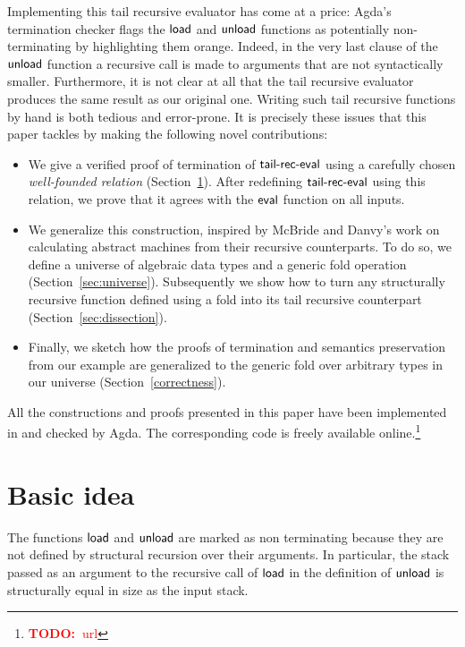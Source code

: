 \documentclass[sigplan,10pt,review]{acmart}
\newcommand\todo[1]{\textcolor{red}{\textbf{TODO:~}#1}}
\newcommand{\AF}{\AgdaFunction}
\newcommand{\nonterm}[1]{\hspace*{-0.1cm}\colorbox{orange!25}{#1}}
\begin{document}
Implementing this tail recursive evaluator has come at a price: Agda's
termination checker flags the \ensuremath{\AF{load}} and \ensuremath{\AF{unload}} functions as
potentially non-terminating by highlighting them
\nonterm{orange}. Indeed, in the very last clause of the \ensuremath{\AF{unload}}
function a recursive call is made to arguments that are not
syntactically smaller. Furthermore, it is not clear at all that the
tail recursive evaluator produces the same result as our original
one. Writing such tail recursive functions by hand is both tedious and
error-prone. It is precisely these issues that this paper tackles
by making the following novel contributions:

\begin{itemize}
\item We give a verified proof of termination of \ensuremath{\AF{tail\text{-}rec\text{-}eval}} using
  a carefully chosen \emph{well-founded relation}
  (Section~\ref{sec:basics}). After redefining \ensuremath{\AF{tail\text{-}rec\text{-}eval}} using
  this relation, we prove that it agrees with the \ensuremath{\AF{eval}} function on
  all inputs.
\item We generalize this construction, inspired by McBride and Danvy's
  work on calculating abstract machines from their recursive
  counterparts. To do so, we define a universe of algebraic data types
  and a generic fold operation
  (Section~\ref{sec:universe}). Subsequently we show how to turn any
  structurally recursive function defined using a fold into its tail
  recursive counterpart (Section~\ref{sec:dissection}).
\item Finally, we sketch how the proofs of termination and semantics
  preservation from our example are generalized to the generic fold
  over arbitrary types in our universe
  (Section~\ref{correctness}). 

\end{itemize}

All the constructions and proofs presented in this paper have been
implemented in and checked by Agda. The corresponding code is freely
available online.\footnote{\todo{url}}


\section{Basic idea}
\label{sec:basics}
The functions \ensuremath{\AF{load}} and \ensuremath{\AF{unload}} are marked as non terminating
because they are not defined by structural recursion over their
arguments. In particular, the stack passed as an argument to the
recursive call of \ensuremath{\AF{load}} in the definition of \ensuremath{\AF{unload}} is structurally
equal in size as the input stack.
\end{document}
